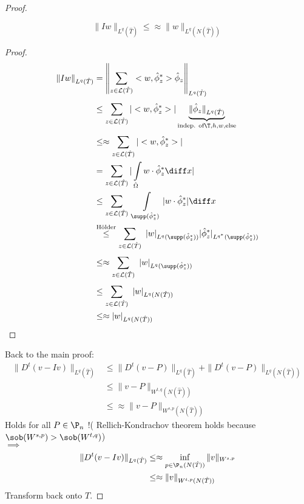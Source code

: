 \begin{proof}
\begin{itemize}
\begin{lemma}
\begin{equation*}
				\|Iw\|_{L^{q}(\hat{T})} \leq \approx \|w\|_{L^{q}(N(\hat{T}))}
			\end{equation*}
		\end{lemma}
		\begin{proof}
			\begin{align*}
				\|Iw\|_{L^{q}(\hat{T})} &= \left\|\sum\limits_{z \in\mathcal{L}(\hat{T})}^{} <w,\hat{\phi}_{z}^*>\hat{\phi}_{z}\right\|_{L^{q}(\hat{T})}\\
										&\leq \sum\limits_{z \in\mathcal{L}(\hat{T})}^{} |<w,\hat{\phi}_{z}^*>| \underbrace{\|\hat{\phi}_{z}\|_{L^{q}(\hat{T})}}_{\text{indep. of} \T,h,w,\text{else}}\\
										&\leq\approx \sum\limits_{z \in\mathcal{L}(\hat{T})}^{} |<w,\hat{\phi}_{z}^*>|\\
										&= \sum\limits_{z \in\mathcal{L}(\hat{T})}^{} |\int\limits_{\hat{\Omega}}w\cdot\hat{\phi}_{z}^*\diff x |\\
										&\leq \sum\limits_{z \in\mathcal{L}(\hat{T})}^{} \  \int\limits_{\supp(\hat{\phi}_{z}^*)} |w \cdot \hat{\phi}_{z}^*|\diff x \\
										&\overset{\text{Hölder}}{\leq} \sum\limits_{z \in\mathcal{L}(\hat{T})}^{} \ |w|_{L^q(\supp(\hat{\phi}_{z}^*))} |\hat{\phi}_{z}^*|_{L^{q^*}(\supp(\hat{\phi}_{z}^*))}\\
										&\leq\approx \sum\limits_{z \in\mathcal{L}(\hat{T})}^{} \ |w|_{L^q(\supp(\hat{\phi}_{z}^*))} \\
										&\leq \sum\limits_{z \in\mathcal{L}(\hat{T})}^{} \ |w|_{L^q(N(\hat{T}))} \\
										&\leq\approx |w|_{L^q(N(\hat{T}))}
			\end{align*}
		\end{proof}
	\end{itemize}
	Back to the main proof:
	\begin{align*}
		\|D^t(v-Iv)\|_{L^{q}(\hat{T})} &\leq \|D^t(v-P)\|_{L^{q}(\hat{T})} + \|D^t(v-P)\|_{L^{q}(N(\hat{T}))}\\
									   &\leq \|v-P\|_{W^{t,q}(N(\hat{T}))}\\
									   &\leq\approx \|v-P\|_{W^{s,p}(N(\hat{T}))}
	\end{align*}
	Holds for all $P \in \P_{n}$ !( Rellich-Kondrachov theorem holds because\\ $\sob(W^{s,p})>\sob(W^{t,q})$)\\
	$\implies$
	\begin{align*}
		\|D^t(v-Iv)\|_{L^{q}(\hat{T})} &\leq\approx \inf_{p \in \P_{n}(N(\hat{T}))} \|v\|_{W^{s,p}} \\
									   &\leq\approx \|v\|_{W^{t,p}(N(\hat{T}))}
	\end{align*}
	Transform back onto $T$.
\end{proof}


